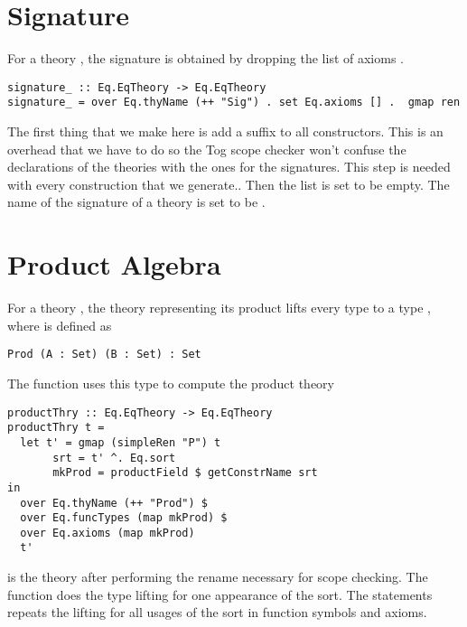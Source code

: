\section{Signature}
For a theory , the signature is obtained by dropping the list of axioms . 
\begin{verbatim}
signature_ :: Eq.EqTheory -> Eq.EqTheory
signature_ = over Eq.thyName (++ "Sig") . set Eq.axioms [] .  gmap ren
\end{verbatim}
The first thing that we make here is add a suffix  to all constructors. This is an overhead that we have to do so the Tog scope checker won't confuse the declarations of the theories with the ones for the signatures. This step is needed with every construction that we generate.. 
Then the  list is set to be empty. The name of the signature of a theory  is set to be . 

\section{Product Algebra} 
For a theory , the theory  representing its product lifts every type  to a type , where  is defined as 
\begin{lstlisting}
Prod (A : Set) (B : Set) : Set
\end{lstlisting}
The function  uses this type to compute the product theory 
\begin{verbatim}
productThry :: Eq.EqTheory -> Eq.EqTheory
productThry t =
  let t' = gmap (simpleRen "P") t
       srt = t' ^. Eq.sort
       mkProd = productField $ getConstrName srt
in 
  over Eq.thyName (++ "Prod") $
  over Eq.funcTypes (map mkProd) $
  over Eq.axioms (map mkProd)
  t'
\end{verbatim}
 is the theory after performing the rename necessary for scope checking. The  function does the type lifting for one appearance of the sort. The  statements repeats the lifting for all usages of the sort in function symbols and axioms. 

